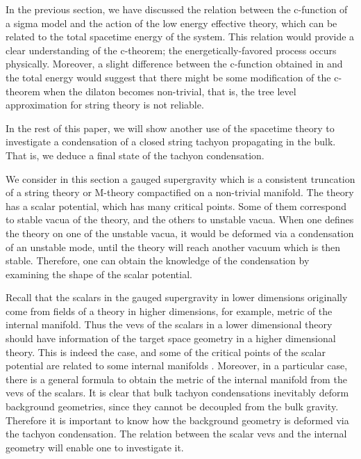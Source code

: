 \documentclass[a4paper,a4paper]{article}
\begin{document}
\vspace{5mm}

In the previous section, we have discussed the relation between the c-function of a sigma model and the action of 
the low energy effective theory, which can be related to the total spacetime energy of the system. 
This relation would provide a clear understanding of the c-theorem; the energetically-favored process occurs 
physically. 
Moreover, a slight difference between the c-function obtained in \cite{Tseytlin} and the total energy would 
suggest that there might be some modification of the c-theorem when the dilaton becomes non-trivial, that is, 
the tree level approximation for string theory is not reliable. 

In the rest of this paper, we will show another use of the spacetime theory to investigate a condensation of a 
closed string tachyon propagating in the bulk. 
That is, we deduce a final state of the tachyon condensation. 

\vspace{3mm}

We consider in this section a gauged supergravity which is a consistent truncation of a string theory or 
M-theory compactified on a non-trivial manifold. 
The theory has a scalar potential, which has many critical points. 
Some of them correspond to stable vacua of the theory, and the others to unstable vacua. 
When one defines the theory on one of the unstable vacua, it would be deformed via a condensation of an unstable 
mode, until the theory will reach another vacuum which is then stable. 
Therefore, one can obtain the knowledge of the condensation by examining the shape of the scalar potential. 

Recall that the scalars in the gauged supergravity in lower dimensions originally come from fields of a theory in 
higher dimensions, 
for example, metric of the internal manifold. 
Thus the vevs of the scalars in a lower dimensional theory should have information of the target space geometry in 
a higher dimensional theory. 
This is indeed the case, and some of the critical points of the scalar potential are related to some internal 
manifolds \cite{AdS/CFT}. 
Moreover, in a particular case, there is a general formula \cite{embedding} to obtain the metric of the internal 
manifold from the vevs of the scalars. 
It is clear that bulk tachyon condensations inevitably deform background geometries, since they cannot be 
decoupled from the bulk gravity. 
Therefore it is important to know how the background geometry is deformed via the tachyon condensation. 
The relation between the scalar vevs and the internal geometry will enable one to investigate it. 
\end{document}
